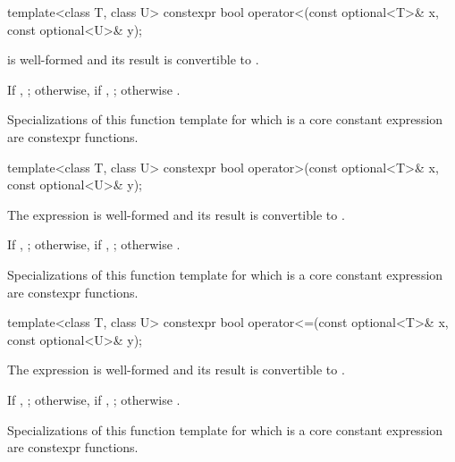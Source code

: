 %
\begin{itemdecl}
template<class T, class U> constexpr bool operator<(const optional<T>& x, const optional<U>& y);
\end{itemdecl}

\begin{itemdescr}
\pnum
\constraints
{} is well-formed
and its result is convertible to .

\pnum
\returns
If , ;
otherwise, if , ;
otherwise .

\pnum
\remarks
Specializations of this function template
for which  is a core constant expression
are constexpr functions.
\end{itemdescr}

%
\begin{itemdecl}
template<class T, class U> constexpr bool operator>(const optional<T>& x, const optional<U>& y);
\end{itemdecl}

\begin{itemdescr}
\pnum
\constraints
The expression  is well-formed and
its result is convertible to .

\pnum
\returns
If , ;
otherwise, if , ;
otherwise .

\pnum
\remarks
Specializations of this function template
for which  is a core constant expression
are constexpr functions.
\end{itemdescr}

%
\begin{itemdecl}
template<class T, class U> constexpr bool operator<=(const optional<T>& x, const optional<U>& y);
\end{itemdecl}

\begin{itemdescr}
\pnum
\constraints
The expression  is well-formed and
its result is convertible to .

\pnum
\returns
If , ;
otherwise, if , ;
otherwise .

\pnum
\remarks
Specializations of this function template
for which  is a core constant expression
are constexpr functions.
\end{itemdescr}

